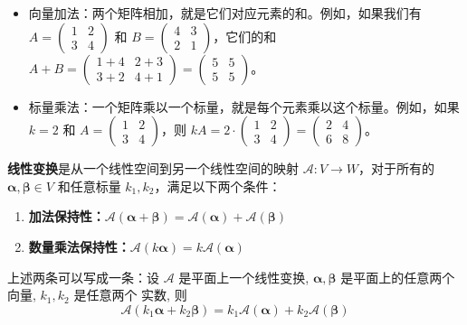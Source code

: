 \begin{itemize}
    \item 向量加法：两个矩阵相加，就是它们对应元素的和。例如，如果我们有 \(A = \begin{pmatrix} 1 & 2 \\ 3 & 4 \end{pmatrix}\) 和 \(B = \begin{pmatrix} 4 & 3 \\ 2 & 1 \end{pmatrix}\)，它们的和 \(A + B = \begin{pmatrix} 1+4 & 2+3 \\ 3+2 & 4+1 \end{pmatrix} = \begin{pmatrix} 5 & 5 \\ 5 & 5 \end{pmatrix}\)。
    \item 标量乘法：一个矩阵乘以一个标量，就是每个元素乘以这个标量。例如，如果 \(k = 2\) 和 \(A = \begin{pmatrix} 1 & 2 \\ 3 & 4 \end{pmatrix}\)，则 \(kA = 2 \cdot \begin{pmatrix} 1 & 2 \\ 3 & 4 \end{pmatrix} = \begin{pmatrix} 2 & 4 \\ 6 & 8 \end{pmatrix}\)。
\end{itemize}

\begin{definition}[线性变换]
    \textcolor{third}{\bf 线性变换}是从一个线性空间到另一个线性空间的映射 \(\mathcal{A}: V \rightarrow W\)，对于所有的 \(\boldsymbol{\alpha}, \boldsymbol{\beta} \in V\) 和任意标量 \(k_1, k_2\)，满足以下两个条件：

    \begin{enumerate}
        \item \textbf{加法保持性：}\(\mathcal{A}(\boldsymbol{\alpha} + \boldsymbol{\beta}) = \mathcal{A}(\boldsymbol{\alpha}) + \mathcal{A}(\boldsymbol{\beta})\)
        \item \textbf{数量乘法保持性：}\(\mathcal{A}(k\boldsymbol{\alpha}) = k\mathcal{A}(\boldsymbol{\alpha})\)
    \end{enumerate}
\end{definition}

上述两条可以写成一条：设 $\mathcal{A}$ 是平面上一个线性变换, $\boldsymbol{\alpha}, \boldsymbol{\beta}$ 是平面上的任意两个向量, $k_1, k_2$ 是任意两个 实数, 则
\begin{equation}
  \mathcal{A}\left(k_1 \boldsymbol{\alpha}+k_2 \boldsymbol{\beta}\right)=k_1 \mathcal{A} (\boldsymbol{\alpha})+k_2 \mathcal{A} (\boldsymbol{\beta})
\end{equation}

